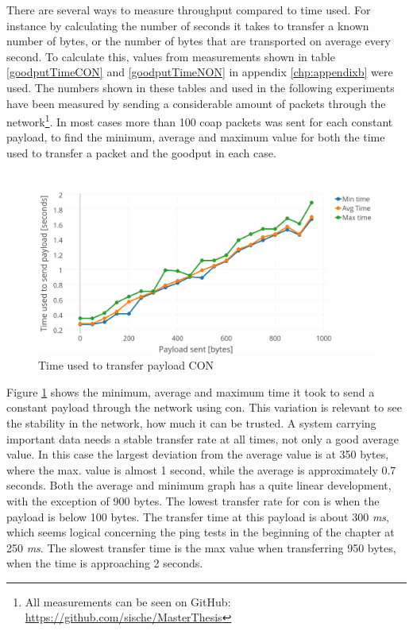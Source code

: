 \noindent There are several ways to measure throughput compared to time used. For instance by calculating the number of seconds it takes to transfer a known number of bytes, or the number of bytes that are transported on average every second. To calculate this, values from measurements shown in table \ref{goodputTimeCON} and \ref{goodputTimeNON} in appendix \ref{chp:appendixb} were used. The numbers shown in these tables and used in the following experiments have been measured by sending a considerable amount of packets through the network\footnote{All measurements can be seen on GitHub: \url{https://github.com/sische/MasterThesis}}. In most cases more than 100 \gls{coap} packets was sent for each constant payload, to find the minimum, average and maximum value for both the time used to transfer a packet and the \gls{goodput} in each case. 

\begin{figure}[h!]
    \centering
    \includegraphics[width=1.0\textwidth]{bytesPrSecondNew3.png}    
    \caption{Time used to transfer payload CON}
    \label{fig:bytesPRSecond3}
\end{figure}


\noindent Figure \ref{fig:bytesPRSecond3} shows the minimum, average and maximum time it took to send a constant payload through the network using \gls{con}. This variation is relevant to see the stability in the network, how much it can be trusted. A system carrying important data needs a stable transfer rate at all times, not only a good average value. In this case the largest deviation from the average value is at 350 bytes, where the max. value is almost 1 second, while the average is approximately 0.7 seconds. Both the average and minimum graph has a quite linear development, with the exception of 900 bytes. The lowest transfer rate for \gls{con} is when the payload is below 100 bytes. The transfer time at this payload is about 300 \textit{ms}, which seems logical concerning the ping tests in the beginning of the chapter at 250 \textit{ms}. The slowest transfer time is the max value when transferring 950 bytes, when the time is approaching 2 seconds.  


